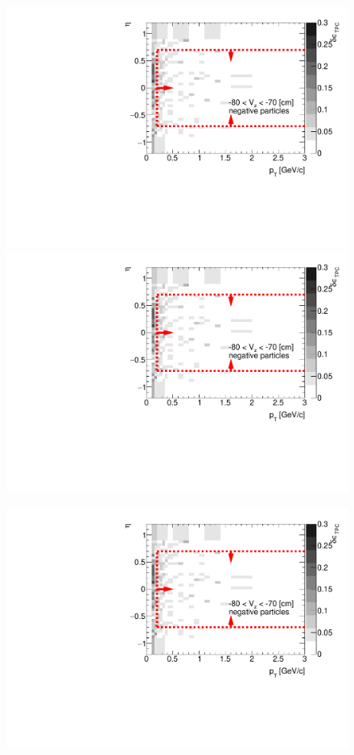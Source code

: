 \begin{figure}[H]
{		\includegraphics[width=\linewidth,page=11]{graphics/systematicsEfficiency/deadMaterial/secondaries_Unbinned_Charged_SD.pdf}
		\includegraphics[width=\linewidth,page=14]{graphics/systematicsEfficiency/deadMaterial/secondaries_Unbinned_Charged_SD.pdf}\\
	}%
	\parbox{0.325\textwidth}{
		\includegraphics[width=\linewidth,page=3]{graphics/systematicsEfficiency/deadMaterial/secondaries_Unbinned_Charged_SD.pdf}\\
}
\end{figure}
